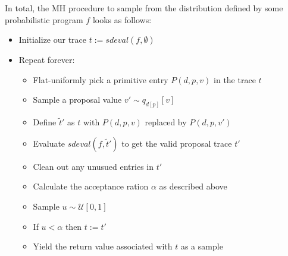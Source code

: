 In total, the MH procedure to sample from the distribution defined by some probabilistic program $f$ looks as follows:

\begin{itemize}
\item Initialize our trace $t := sdeval(f,\emptyset)$
\item Repeat forever:
  \begin{itemize}
  \item Flat-uniformly pick a primitive entry $P(d,p,v)$ in the trace $t$
  \item Sample a proposal value $v' \sim q_{d[p]}[v]$
  \item Define $\tilde{t}'$ as $t$ with $P(d,p,v)$ replaced by $P(d,p,v')$
  \item Evaluate $sdeval(f,\tilde{t}')$ to get the valid proposal trace $t'$
  \item Clean out any unusued entries in $t'$
  \item Calculate the acceptance ration $\alpha$ as described above
  \item Sample $u \sim \mathcal{U}[0,1]$
  \item If $u < \alpha$ then $t := t'$
  \item Yield the return value associated with $t$ as a sample
  \end{itemize}
\end{itemize}
